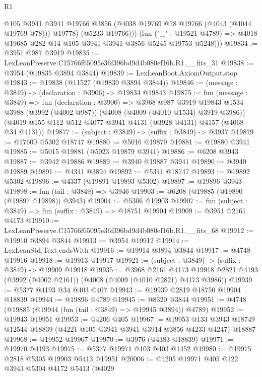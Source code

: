 \begin{lexlean}{R1}
\begin{coremodule}
              @105
              @3941
              @3941
              @19766
              @3856
              (@4038 @19769 @78 @19766 (@4043 (@4044 @19769 @78)))
              @19778)
            (@5233 @19766)))
        (fun ("_" : @19521 @4789) =>
        @4018 @19685 @282 @14 @105 @3941 @3941 @3856 @5245 @19753 @5248)))
@19834 := @3951 @987 @3919
@19835 := LexLeanPreserve.C15766f65095e36f396bd9d4b080ef16b.R1.__fits_31
@19838 := @3954 (@19835 @3894 @3844)
@19839 := LexLeanBoot.AxiomOutput.stop
@19843 := @19838 (@11527 (@19839 @3894 @3844))
@19846 := (message : @3849) -> (declaration : @3906) -> @19834 @19843
@19875 := fun (message : @3849) =>
  fun (declaration : @3906) =>
  @3968
    @987
    @3919
    @19843
    @1534
    @3988
    (@3992 (@4002 @987))
    (@4008 (@4009 (@4010 @1534) @3919 @3986))
    (@4019 @155 @112 @512 @4077 @3941 @4131 (@3928 @4131) @4157 (@4068 @34 @4131))
@19877 := (subject : @3849) -> (suffix : @3849) -> @3937
@19879 := @17600 @5302 @18747
@19880 := @5016 @19879
@19881 := @19880 @3941
@19885 := @5015 @19881 (@5023 @19879 @3941)
@19886 := @6208 @3943
@19887 := @3942 @19886
@19889 := @3940 @19887 @3941
@19890 := @3940 @19889
@19891 := @4341 @3894
@19892 := @5341 @18747
@19893 := @19892 @5302
@19896 := @4337 (@19891 @19893 @5302)
@19897 := @19896 @3943
@19898 := fun (tail : @3849) => @3946
@19903 := @6208 (@19885 (@19890 (@19897 @19898)) @3943)
@19904 := @5306 @19903
@19907 := fun (subject : @3849) => fun (suffix : @3849) => @18751 @19904
@19909 := @3951 @2161 @4173
@19910 := LexLeanPreserve.C15766f65095e36f396bd9d4b080ef16b.R1.__fits_68
@19912 := @19910 @3894 @3844
@19913 := @3954 @19912
@19914 := LexLeanStd.Text.endsWith
@19916 := @19914 @3894 @3844
@19917 := @4748 @19916
@19918 := @19913 @19917
@19921 := (subject : @3849) -> (suffix : @3849) -> @19909 @19918
@19935 := @3968
    @2161
    @4173
    @19918
    @2821
    @4193
    (@3992 (@4002 @2161))
    (@4008 (@4009 (@4010 @2821) @4173 @3986))
@19939 := @5377 @4193 @34 @403 @407
@19943 := @19939 @2819 @18750 @19904 @18839
@19944 := @19896 @4789
@19945 := @8320 @3844
@19951 := @4748 (@19885 (@19944 (fun (tail : @3849) => @19945 @3894)) @4789)
@19952 := @19943 @19951
@19953 := @4206 @405
@19967 := @19953
    @133
    @3943
    @18749
    @12544
    @18839
    (@4221 @105 @3941 @3941 @3914 @3856 @4233 @4247)
    @18887
@19968 := @19952 @19967
@19970 := @3976 (@4383 @18839)
@19971 := @19970 @4193
@19975 := @5377 @19971 @103 @403 @1452
@19980 := @19975 @2818 @5305 @19903 @5413 @19951
@20006 := @4205
    @19971
    @405
    @122
    @3943
    @5304
    @4172
    @5413
    (@4029

\end{coremodule}
\end{lexlean}

